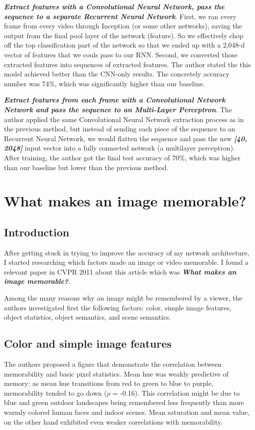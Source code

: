 \textbf{\emph{Extract features with a Convolutional Neural Network, pass the sequence to a separate Recurrent Neural Network}}. First, we ran every frame from every video through Inception (or some other networks), saving the output from the final pool layer of the network (feature). So we effectively chop off the top classification part of the network so that we ended up with a 2,048-d vector of features that we couls pass to our RNN. Second, we converted those extracted features into sequences of extracted features. The author stated the this model achieved better than the CNN-only results. The concretely accuracy number was 74\%, which was significantly higher than our baseline.

\textbf{\emph{Extract features from each frame with a Convolutional Network Network and pass the sequence to an Multi-Layer Perceptron}}. The author applied the same Convolutional Neural Network extraction process as in the previous method, but instead of sending each piece of the sequence to an Recurrent Neural Network, we would flatten the sequence and pass the new \textbf{\emph{[40, 2048]}} input vector into a fully connected network (a multilayer perceptron). After training, the author got the final test accuracy of 70\%, which was higher than our baseline but lower than the previous method.

\section{What makes an image memorable?}
\subsection{Introduction}
After getting stuck in trying to improve the accuracy of my network architecture, I started researching which factors made an image or video memorable. I found a relevant paper in CVPR 2011 about this article which was \textbf{\emph{What makes an image memorable?}}\cite{imagememorable}.

Among the many reasons why an image might be remembered by a viewer, the authors investigated first the following factors: color, simple image features, object statistics, object semantics, and scene semantics.

\subsection{Color and simple image features}
The authors proposed a figure that demonstrate the correlation between memorability and basic pixel statistics. Mean hue was weakly predictive of memory: as mean hue transitions from red to green to blue to purple, memorability tended to go down ($\rho$ = -0.16). This correlation might be due to blue and green outdoor landscapes being remembered less frequently than more warmly colored human faces and indoor scenes. Mean saturation and mean value, on the other hand exhibited even weaker correlations with memorability. 

